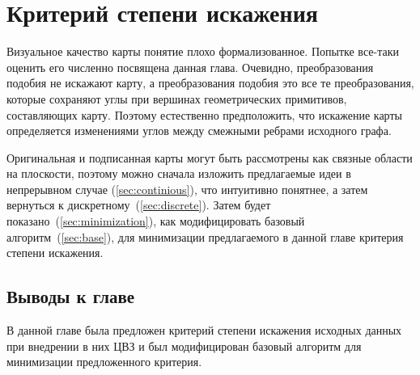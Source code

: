 \chapter{Критерий степени искажения}

Визуальное качество карты понятие плохо формализованное. Попытке все-таки оценить его численно посвящена данная
глава. Очевидно, преобразования подобия не искажают карту, а преобразования подобия это все те преобразования, 
которые сохраняют углы при вершинах геометрических 
примитивов, составляющих карту. Поэтому естественно предположить, что искажение карты определяется изменениями
углов между смежными ребрами исходного графа.

Оригинальная и подписанная карты могут быть рассмотрены как связные области на плоскости, поэтому можно сначала
изложить предлагаемые идеи в непрерывном случае (\ref{sec:continious}), что интуитивно понятнее, а затем вернуться к 
дискретному~(\ref{sec:discrete}). Затем будет показано~(\ref{sec:minimization}), как модифицировать 
базовый алгоритм~(\ref{sec:base}), для минимизации предлагаемого в данной главе критерия степени искажения.





\section{Выводы к главе}
В данной главе была предложен критерий степени искажения исходных данных при внедрении в них ЦВЗ
и был модифицирован базовый алгоритм для минимизации предложенного критерия.
